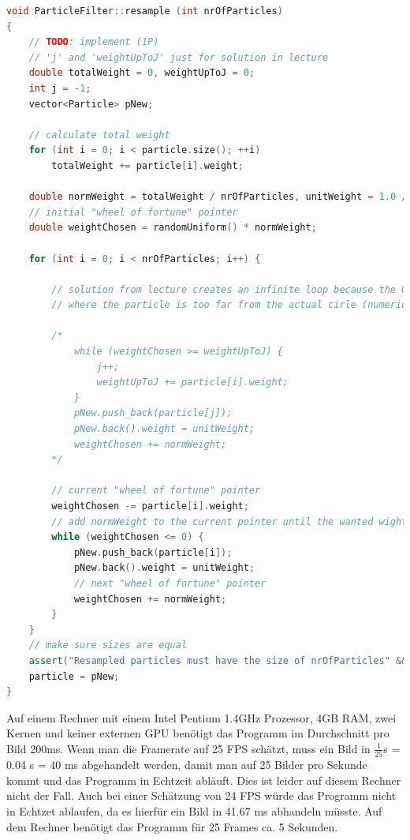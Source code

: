 \documentclass{ezb}
\begin{document}
\begin{lstlisting}[language=C++, caption=Draw particles from the particle set resetting their weight to 1.]
void ParticleFilter::resample (int nrOfParticles)
{
	// TODO: implement (1P)
	// 'j' and 'weightUpToJ' just for solution in lecture
	double totalWeight = 0, weightUpToJ = 0;
	int j = -1;
	vector<Particle> pNew;

	// calculate total weight
	for (int i = 0; i < particle.size(); ++i)
		totalWeight += particle[i].weight;

	double normWeight = totalWeight / nrOfParticles, unitWeight = 1.0 / nrOfParticles;
	// initial "wheel of fortune" pointer
	double weightChosen = randomUniform() * normWeight;

	for (int i = 0; i < nrOfParticles; i++) {

		// solution from lecture creates an infinite loop because the Gaussian distribution becomes 0 at some points
		// where the particle is too far from the actual cirle (numerical underflow)

		/*
			while (weightChosen >= weightUpToJ) {
				j++;
				weightUpToJ += particle[i].weight;
			}
			pNew.push_back(particle[j]);
			pNew.back().weight = unitWeight;
			weightChosen += normWeight;
		*/

		// current "wheel of fortune" pointer
		weightChosen -= particle[i].weight;
		// add normWeight to the current pointer until the wanted wight is archieved
		while (weightChosen <= 0) {
			pNew.push_back(particle[i]);
			pNew.back().weight = unitWeight;
			// next "wheel of fortune" pointer
			weightChosen += normWeight;
		}
	}
	// make sure sizes are equal
	assert("Resampled particles must have the size of nrOfParticles" && pNew.size() == nrOfParticles);
	particle = pNew;
}
\end{lstlisting}

\newpage

Auf einem Rechner mit einem Intel Pentium 1.4GHz Prozessor, 4GB RAM, zwei Kernen und keiner externen GPU benötigt das Programm im Durchschnitt pro Bild 200ms. Wenn man die Framerate auf 25 FPS schätzt, muss ein Bild in $\frac{1}{25}$s = 0.04 s = 40 ms  abgehandelt werden, damit man auf 25 Bilder pro Sekunde kommt und das Programm in Echtzeit abläuft. Dies ist leider auf diesem Rechner nicht der Fall. Auch bei einer Schätzung von 24 FPS würde das Programm nicht in Echtzet ablaufen, da es hierfür ein Bild in 41.67 ms abhandeln müsste. Auf dem Rechner benötigt das Programm für 25 Frames ca. 5 Sekunden.
\end{document}
